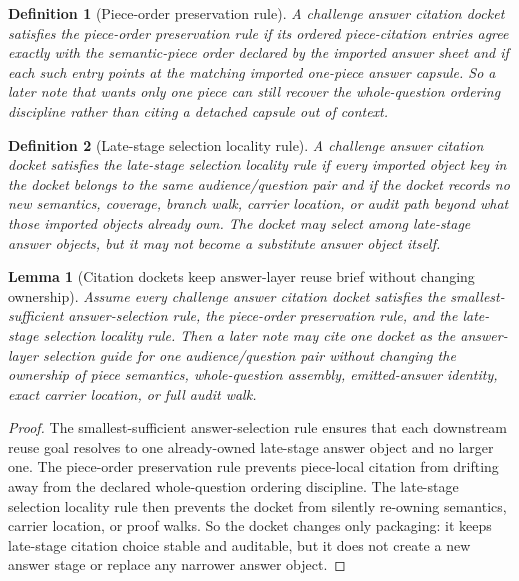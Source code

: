 \documentclass[11pt]{article}
\newtheorem{definition}{Definition}
\newtheorem{lemma}{Lemma}
\begin{document}
\begin{definition}[Piece-order preservation rule]
A challenge answer citation docket satisfies the \emph{piece-order preservation rule} if its ordered piece-citation entries agree exactly with the semantic-piece order declared by the imported answer sheet and if each such entry points at the matching imported one-piece answer capsule.
So a later note that wants only one piece can still recover the whole-question ordering discipline rather than citing a detached capsule out of context.
\end{definition}

\begin{definition}[Late-stage selection locality rule]
A challenge answer citation docket satisfies the \emph{late-stage selection locality rule} if every imported object key in the docket belongs to the same audience/question pair and if the docket records no new semantics, coverage, branch walk, carrier location, or audit path beyond what those imported objects already own.
The docket may select among late-stage answer objects, but it may not become a substitute answer object itself.
\end{definition}

\begin{lemma}[Citation dockets keep answer-layer reuse brief without changing ownership]
Assume every challenge answer citation docket satisfies the smallest-sufficient answer-selection rule, the piece-order preservation rule, and the late-stage selection locality rule.
Then a later note may cite one docket as the answer-layer selection guide for one audience/question pair without changing the ownership of piece semantics, whole-question assembly, emitted-answer identity, exact carrier location, or full audit walk.
\end{lemma}

\begin{proof}
The smallest-sufficient answer-selection rule ensures that each downstream reuse goal resolves to one already-owned late-stage answer object and no larger one.
The piece-order preservation rule prevents piece-local citation from drifting away from the declared whole-question ordering discipline.
The late-stage selection locality rule then prevents the docket from silently re-owning semantics, carrier location, or proof walks.
So the docket changes only packaging: it keeps late-stage citation choice stable and auditable, but it does not create a new answer stage or replace any narrower answer object.\qedhere
\end{proof}
\end{document}
